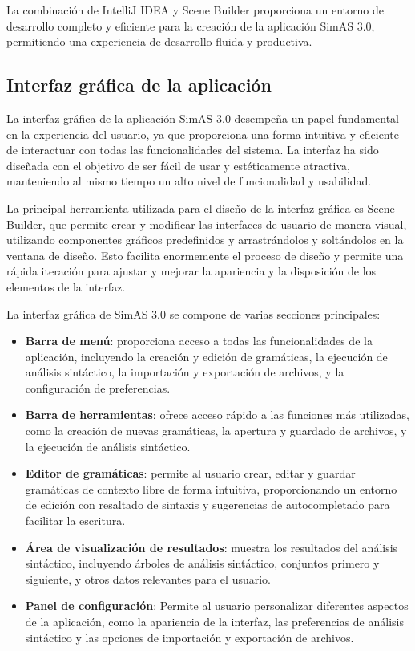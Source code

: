 La combinación de IntelliJ IDEA y Scene Builder proporciona un entorno de desarrollo completo y eficiente para la creación de la aplicación SimAS 3.0, permitiendo una experiencia de desarrollo fluida y productiva.


\subsection{Interfaz gráfica de la aplicación}

La interfaz gráfica de la aplicación SimAS 3.0 desempeña un papel fundamental en la experiencia del usuario, ya que proporciona una forma intuitiva y eficiente de interactuar con todas las funcionalidades del sistema. La interfaz ha sido diseñada con el objetivo de ser fácil de usar y estéticamente atractiva, manteniendo al mismo tiempo un alto nivel de funcionalidad y usabilidad.

La principal herramienta utilizada para el diseño de la interfaz gráfica es Scene Builder, que permite crear y modificar las interfaces de usuario de manera visual, utilizando componentes gráficos predefinidos y arrastrándolos y soltándolos en la ventana de diseño. Esto facilita enormemente el proceso de diseño y permite una rápida iteración para ajustar y mejorar la apariencia y la disposición de los elementos de la interfaz.

La interfaz gráfica de SimAS 3.0 se compone de varias secciones principales:

\begin{itemize}
    \item \textbf{Barra de menú}: proporciona acceso a todas las funcionalidades de la aplicación, incluyendo la creación y edición de gramáticas, la ejecución de análisis sintáctico, la importación y exportación de archivos, y la configuración de preferencias.
    \item \textbf{Barra de herramientas}: ofrece acceso rápido a las funciones más utilizadas, como la creación de nuevas gramáticas, la apertura y guardado de archivos, y la ejecución de análisis sintáctico.
    
    \item \textbf{Editor de gramáticas}: permite al usuario crear, editar y guardar gramáticas de contexto libre de forma intuitiva, proporcionando un entorno de edición con resaltado de sintaxis y sugerencias de autocompletado para facilitar la escritura.
    
    \item \textbf{Área de visualización de resultados}: muestra los resultados del análisis sintáctico, incluyendo árboles de análisis sintáctico, conjuntos primero y siguiente, y otros datos relevantes para el usuario.
    
    \item \textbf{Panel de configuración}: Permite al usuario personalizar diferentes aspectos de la aplicación, como la apariencia de la interfaz, las preferencias de análisis sintáctico y las opciones de importación y exportación de archivos.
\end{itemize}

